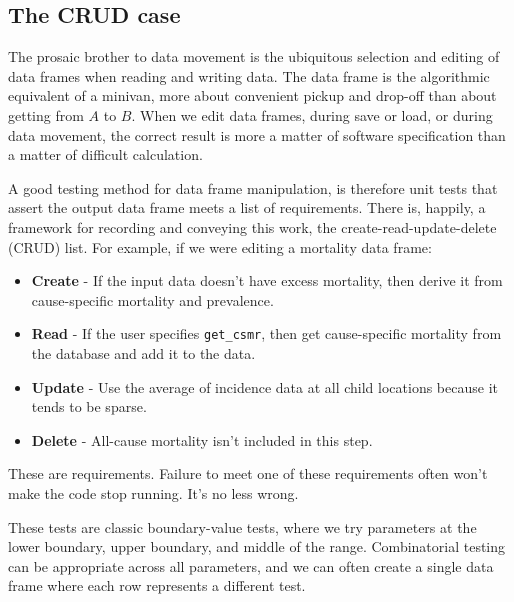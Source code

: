 \documentclass[fleqn,10pt]{olplainarticle}
\begin{document}
\subsection{The CRUD case}\label{sec:crud}

The prosaic brother to data movement is the ubiquitous selection
and editing of data frames when reading and writing data.
The data frame is the algorithmic equivalent of a minivan, more
about convenient pickup and drop-off than about getting from $A$
to $B$. When we edit data frames, during save or load, or during
data movement, the correct result is more a matter of software specification
than a matter of difficult calculation.

A good testing method for data frame manipulation, is therefore
unit tests that assert the output data frame meets a list of requirements.
There is, happily, a framework
for recording and conveying this work, the create-read-update-delete
(CRUD) list. For example, if we were editing a mortality data frame:
\begin{itemize}
\item \textbf{Create} - If the input data doesn't have excess mortality,
  then derive it from cause-specific mortality and prevalence.
\item \textbf{Read} - If the user specifies \lstinline!get_csmr!, then get cause-specific
  mortality from the database and add it to the data.
\item \textbf{Update} - Use the average of incidence data at all child
  locations because it tends to be sparse.
\item \textbf{Delete} - All-cause mortality isn't included in this step.
\end{itemize}
These are requirements. Failure to meet one of these requirements
often won't make the code stop running. It's no less wrong.

These tests are classic boundary-value tests, where
we try parameters at the lower boundary, upper boundary,
and middle of the range. Combinatorial testing can be appropriate
across all parameters, and we can often create a single data frame
where each row represents a different test.
\end{document}
